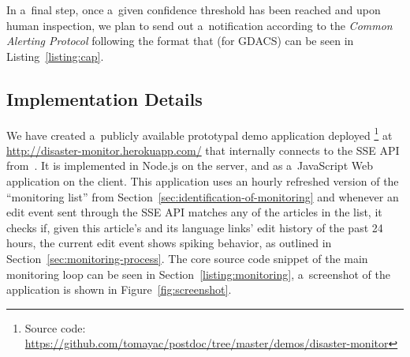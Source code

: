 \documentclass[letterpaper]{article}
\begin{document}
In a~final step, once a~given confidence threshold has been reached
and upon human inspection, we plan to send out a~notification
according to the \emph{Common Alerting Protocol}
following the format that (for GDACS) can be seen in Listing~\ref{listing:cap}.

\subsection{Implementation Details}

We have created a~publicly available prototypal demo application
deployed%
\footnote{Source code:
\url{https://github.com/tomayac/postdoc/tree/master/demos/disaster-monitor}}
at \url{http://disaster-monitor.herokuapp.com/}
that internally connects to the SSE API from~\cite{steiner2014bots}.
It is implemented in Node.js on the server,
and as a~JavaScript Web application on the client.
This application uses an hourly refreshed version of the ``monitoring list''
from Section~\ref{sec:identification-of-monitoring}
and whenever an edit event sent through the SSE API
matches any of the articles in the list,
it checks if, given this article's and its language links'
edit history of the past 24 hours,
the current edit event shows spiking behavior,
as outlined in Section~\ref{sec:monitoring-process}.
The core source code snippet of the main monitoring loop
can be seen in Section~\ref{listing:monitoring},
a~screenshot of the application is shown in Figure~\ref{fig:screenshot}.
\end{document}
